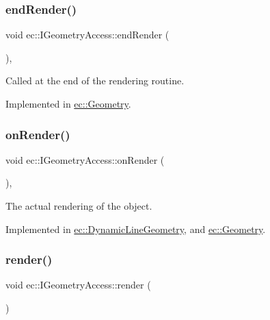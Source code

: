 \subsubsection{\texorpdfstring{end\+Render()}{endRender()}}
{\footnotesize\ttfamily void ec\+::\+I\+Geometry\+Access\+::end\+Render (\begin{DoxyParamCaption}{ }\end{DoxyParamCaption})\hspace{0.3cm}{\ttfamily [protected]}, {}}

Called at the end of the rendering routine. 

Implemented in \mbox{\hyperlink{classec_1_1_geometry_ae0352702162501df185517e84c3b02bd}{ec\+::\+Geometry}}.

\mbox{\label{classec_1_1_i_geometry_access_a2ee418c9fa4eb266347bae2f0ef8095b}} 
\subsubsection{\texorpdfstring{on\+Render()}{onRender()}}
{\footnotesize\ttfamily void ec\+::\+I\+Geometry\+Access\+::on\+Render (\begin{DoxyParamCaption}{ }\end{DoxyParamCaption})\hspace{0.3cm}{\ttfamily [protected]}, {}}

The actual rendering of the object. 

Implemented in \mbox{\hyperlink{classec_1_1_dynamic_line_geometry_ab56984cee973ef2a73ff67339014f0cf}{ec\+::\+Dynamic\+Line\+Geometry}}, and \mbox{\hyperlink{classec_1_1_geometry_a1f166e70fc880e88092f29ef46afb836}{ec\+::\+Geometry}}.

\mbox{\label{classec_1_1_i_geometry_access_a9b6eaf56646bc2b5aa29385aaba02c7d}} 
\subsubsection{\texorpdfstring{render()}{render()}}
{\footnotesize\ttfamily void ec\+::\+I\+Geometry\+Access\+::render (\begin{DoxyParamCaption}{ }\end{DoxyParamCaption})\hspace{0.3cm}{\ttfamily [virtual]}}



